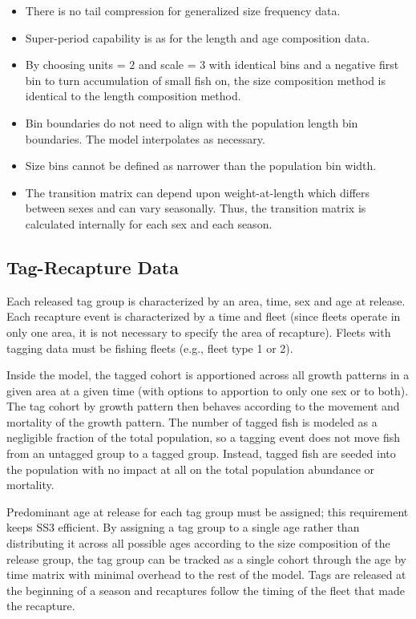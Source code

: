 	\begin{itemize}
		\item There is no tail compression for generalized size frequency data.
		\item Super-period capability is as for the length and age composition data.
		\item By choosing units = 2 and scale = 3 with identical bins and a negative first bin to turn accumulation of small fish on, the size composition method is identical to the length composition method.
		\item Bin boundaries do not need to align with the population length bin boundaries. The model interpolates as necessary.
		\item Size bins cannot be defined as narrower than the population bin width.
		\item The transition matrix can depend upon weight-at-length which differs between sexes and can vary seasonally. Thus, the transition matrix is calculated internally for each sex and each season.
	\end{itemize}

\subsection{Tag-Recapture Data}
Each released tag group is characterized by an area, time, sex and age at release. Each recapture event is characterized by a time and fleet (since fleets operate in only one area, it is not necessary to specify the area of recapture). Fleets with tagging data must be fishing fleets (e.g., fleet type 1 or 2). 

Inside the model, the tagged cohort is apportioned across all growth patterns in a given area at a given time (with options to apportion to only one sex or to both). The tag cohort by growth pattern then behaves according to the movement and mortality of the growth pattern. The number of tagged fish is modeled as a negligible fraction of the total population, so a tagging event does not move fish from an untagged group to a tagged group. Instead, tagged fish are seeded into the population with no impact at all on the total population abundance or mortality. 

Predominant age at release for each tag group must be assigned; this requirement keeps SS3 efficient. By assigning a tag group to a single age rather than distributing it across all possible ages according to the size composition of the release group, the tag group can be tracked as a single cohort through the age by time matrix with minimal overhead to the rest of the model. Tags are released at the beginning of a season and recaptures follow the timing of the fleet that made the recapture.

